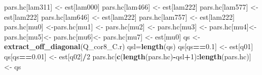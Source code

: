 \documentclass[
]{article}
\newenvironment{Shaded}{\begin{snugshade}}{\end{snugshade}}
\newcommand{\DecValTok}[1]{\textcolor[rgb]{0.00,0.00,0.81}{#1}}
\newcommand{\FloatTok}[1]{\textcolor[rgb]{0.00,0.00,0.81}{#1}}
\newcommand{\FunctionTok}[1]{\textcolor[rgb]{0.13,0.29,0.53}{\textbf{#1}}}
\newcommand{\NormalTok}[1]{#1}
\newcommand{\OtherTok}[1]{\textcolor[rgb]{0.56,0.35,0.01}{#1}}
\newcommand{\SpecialCharTok}[1]{\textcolor[rgb]{0.81,0.36,0.00}{\textbf{#1}}}
\newcommand{\StringTok}[1]{\textcolor[rgb]{0.31,0.60,0.02}{#1}}
\begin{document}
\begin{Shaded}
\begin{Highlighting}[]
\NormalTok{  pars.hc[}\StringTok{\textquotesingle{}lam311\textquotesingle{}}\NormalTok{] }\OtherTok{\textless{}{-}}\NormalTok{ est[}\StringTok{\textquotesingle{}lam000\textquotesingle{}}\NormalTok{]}
\NormalTok{  pars.hc[}\StringTok{\textquotesingle{}lam466\textquotesingle{}}\NormalTok{] }\OtherTok{\textless{}{-}}\NormalTok{ est[}\StringTok{\textquotesingle{}lam222\textquotesingle{}}\NormalTok{]}
\NormalTok{  pars.hc[}\StringTok{\textquotesingle{}lam577\textquotesingle{}}\NormalTok{] }\OtherTok{\textless{}{-}}\NormalTok{ est[}\StringTok{\textquotesingle{}lam222\textquotesingle{}}\NormalTok{]}
\NormalTok{  pars.hc[}\StringTok{\textquotesingle{}lam646\textquotesingle{}}\NormalTok{] }\OtherTok{\textless{}{-}}\NormalTok{ est[}\StringTok{\textquotesingle{}lam222\textquotesingle{}}\NormalTok{]}
\NormalTok{  pars.hc[}\StringTok{\textquotesingle{}lam757\textquotesingle{}}\NormalTok{] }\OtherTok{\textless{}{-}}\NormalTok{ est[}\StringTok{\textquotesingle{}lam222\textquotesingle{}}\NormalTok{]}
\NormalTok{  pars.hc[}\StringTok{\textquotesingle{}mu0\textquotesingle{}}\NormalTok{] }\OtherTok{\textless{}{-}}\NormalTok{pars.hc[}\StringTok{\textquotesingle{}mu1\textquotesingle{}}\NormalTok{] }\OtherTok{\textless{}{-}}\NormalTok{ pars.hc[}\StringTok{\textquotesingle{}mu2\textquotesingle{}}\NormalTok{] }\OtherTok{\textless{}{-}}\NormalTok{ pars.hc[}\StringTok{\textquotesingle{}mu3\textquotesingle{}}\NormalTok{] }\OtherTok{\textless{}{-}}\NormalTok{ pars.hc[}\StringTok{\textquotesingle{}mu4\textquotesingle{}}\NormalTok{]}\OtherTok{\textless{}{-}}\NormalTok{ pars.hc[}\StringTok{\textquotesingle{}mu5\textquotesingle{}}\NormalTok{]}\OtherTok{\textless{}{-}}\NormalTok{ pars.hc[}\StringTok{\textquotesingle{}mu6\textquotesingle{}}\NormalTok{]}\OtherTok{\textless{}{-}}\NormalTok{ pars.hc[}\StringTok{\textquotesingle{}mu7\textquotesingle{}}\NormalTok{] }\OtherTok{\textless{}{-}}\NormalTok{ est[}\StringTok{\textquotesingle{}mu0\textquotesingle{}}\NormalTok{]}
\NormalTok{  qs }\OtherTok{\textless{}{-}} \FunctionTok{extract\_off\_diagonal}\NormalTok{(Q\_cor8\_C.r)}
\NormalTok{  qsl}\OtherTok{=}\FunctionTok{length}\NormalTok{(qs)}
\NormalTok{  qs[qs}\SpecialCharTok{==}\FloatTok{0.1}\NormalTok{] }\OtherTok{\textless{}{-}}\NormalTok{ est[}\StringTok{\textquotesingle{}q01\textquotesingle{}}\NormalTok{]}
\NormalTok{  qs[qs}\SpecialCharTok{==}\FloatTok{0.01}\NormalTok{] }\OtherTok{\textless{}{-}}\NormalTok{ est[}\StringTok{\textquotesingle{}q02\textquotesingle{}}\NormalTok{]}\SpecialCharTok{/}\DecValTok{2}
\NormalTok{  pars.hc[}\FunctionTok{c}\NormalTok{(}\FunctionTok{length}\NormalTok{(pars.hc)}\SpecialCharTok{{-}}\NormalTok{qsl}\SpecialCharTok{+}\DecValTok{1}\NormalTok{)}\SpecialCharTok{:}\FunctionTok{length}\NormalTok{(pars.hc)] }\OtherTok{\textless{}{-}}\NormalTok{ qs}
  

\end{Highlighting}
\end{Shaded}
\end{document}
